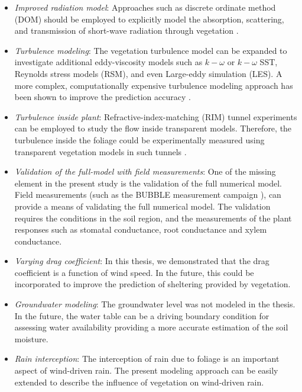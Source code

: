 \begin{itemize}
	\item \textit{Improved radiation model}: Approaches such as discrete ordinate method (DOM) should be employed to explicitly model the absorption, scattering, and transmission of short-wave radiation through vegetation \citep{Gastellu-Etchegorry1996,Bailey2014,Sinoquet2001}.
	
	\item \textit{Turbulence modeling}: The vegetation turbulence model can be expanded to investigate additional eddy-viscosity models such as $k-\omega$ or $k-\omega$ SST, Reynolds stress models (RSM), and even Large-eddy simulation (LES). A more complex, computationally expensive turbulence modeling approach has been shown to improve the prediction accuracy \citep{Hiraoka2011,Yue2008,Lopes2013}.

	\item \textit{Turbulence inside plant}: Refractive-index-matching (RIM) tunnel experiments can be employed to study the flow inside transparent models. Therefore, the turbulence inside the foliage could be experimentally measured using transparent vegetation models in such tunnels \citep{Weitzman2014, Harshani2017,Bai2014a,Bai2012}.

	\item \textit{Validation of the full-model with field measurements}: One of the missing element in the present study is the validation of the full numerical model. Field measurements (such as the BUBBLE measurement campaign \citep{Rotach2005}), can provide a means of validating the full numerical model. The validation requires the conditions in the soil region, and the measurements of the plant responses such as stomatal conductance, root conductance and xylem conductance. 
	
	\item \textit{Varying drag coefficient}: In this thesis, we demonstrated that the drag coefficient is a function of wind speed. In the future, this could be incorporated to improve the prediction of sheltering provided by vegetation. 
	
	\item \textit{Groundwater modeling}: The groundwater level was not modeled in the thesis. In the future, the water table can be a driving boundary condition for assessing water availability providing a more accurate estimation of the soil moisture.

	\item \textit{Rain interception}: The interception of rain due to foliage is an important aspect of wind-driven rain. The present modeling approach can be easily extended to describe the influence of vegetation on wind-driven rain.


\end{itemize}
